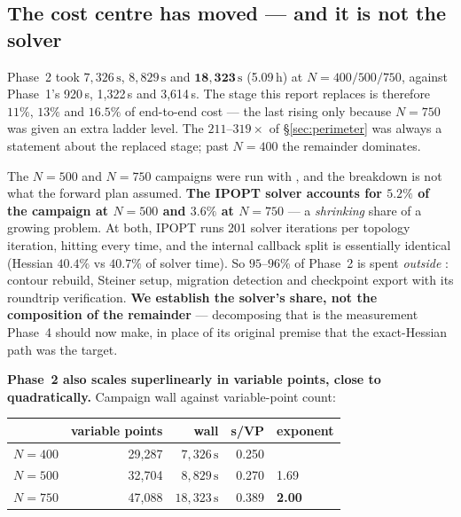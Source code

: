 \documentclass[11pt,a4paper]{article}
\begin{document}
\subsection*{The cost centre has moved --- and it is not the solver}

Phase~2 took \(7{,}326\,\mathrm{s}\), \(8{,}829\,\mathrm{s}\) and
\(\mathbf{18{,}323\,\mathrm{s}}\) (5.09\,h) at \(N{=}400/500/750\), against
Phase~1's 920\,s, 1{,}322\,s and 3{,}614\,s. The stage this report replaces is
therefore \(11\%\), \(13\%\) and \(16.5\%\) of end-to-end cost --- the last rising
only because \(N{=}750\) was given an extra ladder level. The
\(211\text{--}319\times\) of \S\ref{sec:perimeter} was always a statement about
the replaced stage; past \(N{=}400\) the remainder dominates.

The \(N{=}500\) and \(N{=}750\) campaigns were run with , and
the breakdown is not what the forward plan assumed. \textbf{The IPOPT solver
accounts for \(5.2\%\) of the campaign at \(N{=}500\) and \(3.6\%\) at
\(N{=}750\)} --- a \emph{shrinking} share of a growing problem. At both, IPOPT
runs 201 solver iterations per topology iteration, hitting
 every time, and the internal callback split is
essentially identical (Hessian \(40.4\%\) vs \(40.7\%\) of solver time). So
\(95\text{--}96\%\) of Phase~2 is spent \emph{outside} : contour
rebuild, Steiner setup, migration detection and checkpoint export with its
roundtrip verification. \textbf{We establish the solver's share, not the
composition of the remainder} --- decomposing that is the measurement
 Phase~4 should now make,
in place of its original premise that the exact-Hessian path was the target.

\textbf{Phase~2 also scales superlinearly in variable points, close to
quadratically.} Campaign wall against variable-point count:

\begin{center}\small
\begin{tabular}{@{}lrrrl@{}}
\toprule
 & variable points & wall & s/VP & exponent \\
\midrule
\(N{=}400\) & 29{,}287 & \(7{,}326\,\mathrm{s}\) & 0.250 & \\
\(N{=}500\) & 32{,}704 & \(8{,}829\,\mathrm{s}\) & 0.270 & 1.69 \\
\(N{=}750\) & 47{,}088 & \(18{,}323\,\mathrm{s}\) & 0.389 & \textbf{2.00} \\
\bottomrule
\end{tabular}
\end{center}
\end{document}
